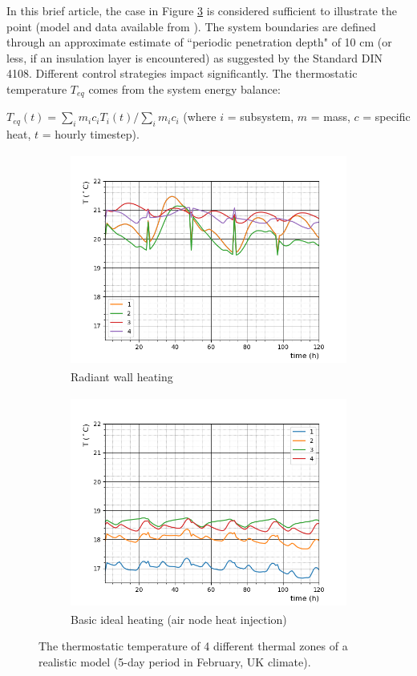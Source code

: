 \documentclass[10pt]{extarticle} %
\begin{document}
In this brief article, the case in Figure \ref{fig:casestudy} is considered sufficient to illustrate the point (model and data available from \cite{Bonetti2020}). The system boundaries are defined through an approximate estimate of ``periodic penetration depth" of 10 cm (or less, if an insulation layer is encountered) as suggested by the Standard DIN 4108. Different control strategies impact significantly. The thermostatic temperature $T_{eq}$ comes from the system energy balance: 

$T_{eq}(t)={\sum_i m_i c_i T_i(t)} / {\sum_i m_i c_i}$  \quad  (where $i$ = subsystem, $m$ = mass, $c$ = specific heat, $t$ = hourly timestep).

\vskip-0.35cm


\begin{figure}[h]
 
\begin{subfigure}{0.5\textwidth}
\includegraphics[width=0.99\linewidth, height=7cm]{images/1.png} 
\caption{Radiant wall heating}
\label{fig:esprmodel}
\end{subfigure}
\begin{subfigure}{0.5\textwidth}
\includegraphics[width=0.99\linewidth, height=7cm]{images/2.png}
\caption{Basic ideal heating (air node heat injection)}
\label{fig:constructionelements}
\end{subfigure}
 \vskip-0.2cm
\caption{The thermostatic temperature of 4 different thermal zones of a realistic model (5-day period in February, UK climate).}
\label{fig:casestudy}
\end{figure}
\end{document}
